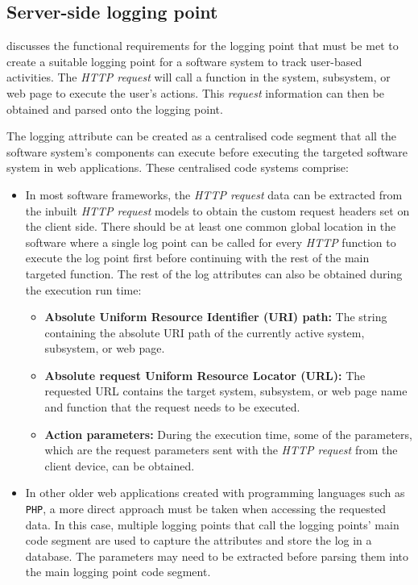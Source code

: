 \clearpage

\subsection{Server-side logging point}\label{sec:ch2_serverSideLoggingpoint}
 discusses the functional requirements for the logging point that must be met to create a suitable logging point for a software system to track user-based activities. The \textit{HTTP request} will call a function in the system, subsystem, or web page to execute the user's actions. This \textit{request} information can then be obtained and parsed onto the logging point. \par The logging attribute can be created as a centralised code segment that all the software system's components can execute before executing the targeted software system in web applications. These centralised code systems comprise:

\begin{itemize}
	\item In most software frameworks, the \textit{HTTP request} data can be extracted from the inbuilt \textit{HTTP request} models to obtain the custom request headers set on the client side. There should be at least one common global location in the software where a single log point can be called for every \textit{HTTP} function to execute the log point first before continuing with the rest of the main targeted function. The rest of the log attributes can also be obtained during the execution run time:
	\begin{itemize}
		\item \textbf{Absolute Uniform Resource Identifier (URI) path:} The string containing the absolute URI path of the currently active system, subsystem, or web page. 
		\item \textbf{Absolute request Uniform Resource Locator (URL):} The requested URL contains the target system, subsystem, or web page name and function that the request needs to be executed. 
		\item \textbf{Action parameters:} During the execution time, some of the parameters, which are the request parameters sent with the \textit{HTTP request} from the client device, can be obtained.
	\end{itemize}
	\item In other older web applications created with programming languages such as \texttt{PHP}, a more direct approach must be taken when accessing the requested data. In this case, multiple logging points that call the logging points' main code segment are used to capture the attributes and store the log in a database. The parameters may need to be extracted before parsing them into the main logging point code segment.
\end{itemize}

